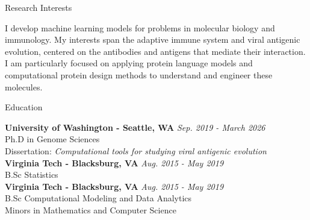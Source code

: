 \documentclass{resume} %
\begin{document}

\begin{rSection}{Research Interests}

I develop machine learning models for problems in molecular biology and immunology.
My interests span the adaptive immune system and viral antigenic evolution, centered on the antibodies and antigens that mediate their interaction.
I am particularly focused on applying protein language models and computational protein design methods to understand and engineer these molecules.

\end{rSection}


\begin{rSection}{Education}

{\bf University of Washington - Seattle, WA} \hfill {\em Sep. 2019 - March 2026}
\\ Ph.D in Genome Sciences
\\ Dissertation: {\em Computational tools for studying viral antigenic evolution} \smallskip \\
{\bf Virginia Tech - Blacksburg, VA} \hfill {\em Aug. 2015 - May 2019}
\\ B.Sc Statistics  \smallskip
\\{\bf Virginia Tech - Blacksburg, VA} \hfill {\em Aug. 2015 - May 2019}
\\ B.Sc Computational Modeling and Data Analytics \smallskip  \\
Minors in Mathematics and Computer Science
\end{rSection}


\end{document}
